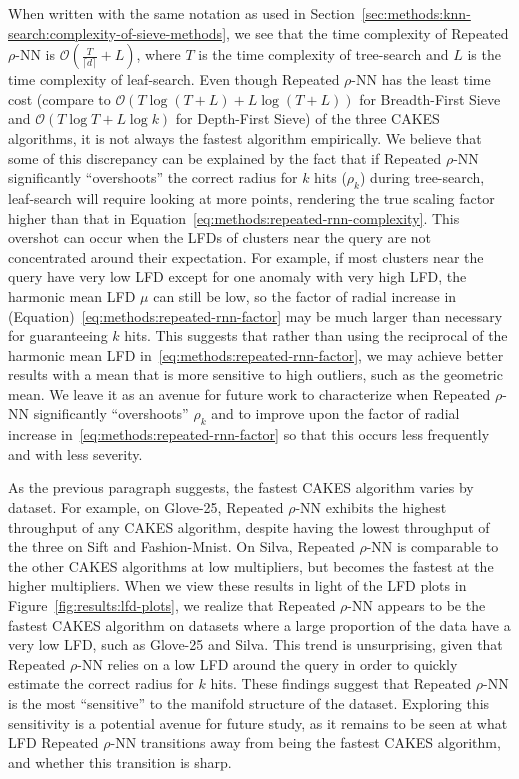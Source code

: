 When written with the same notation as used in Section~\ref{sec:methods:knn-search:complexity-of-sieve-methods}, we see that the time complexity of Repeated $\rho$-NN is $\mathcal{O}(\tfrac{T}{\lceil d \rceil} + L)$, where $T$ is the time complexity of tree-search and $L$ is the time complexity of leaf-search.
Even though Repeated $\rho$-NN has the least time cost (compare to $\mathcal{O}(T\log{(T+L)} + L\log{(T+L)})$ for Breadth-First Sieve and $\mathcal{O}(T\log{T} + L\log{k})$ for Depth-First Sieve) of the three CAKES algorithms, it is not always the fastest algorithm empirically.
We believe that some of this discrepancy can be explained by the fact that if Repeated $\rho$-NN significantly ``overshoots'' the correct radius for $k$ hits ($\rho_k$) during tree-search, leaf-search will require looking at more points, rendering the true scaling factor higher than that in Equation~\ref{eq:methods:repeated-rnn-complexity}.
This overshot can occur when the LFDs of clusters near the query are not concentrated around their expectation.
For example, if most clusters near the query have very low LFD except for one anomaly with very high LFD,
the harmonic mean LFD $\mu$ can still be low, so the factor of radial increase in (Equation)~\ref{eq:methods:repeated-rnn-factor} may be much larger than necessary for guaranteeing $k$ hits.
This suggests that rather than using the reciprocal of the harmonic mean LFD in~\ref{eq:methods:repeated-rnn-factor}, we may achieve better results with a mean that is more sensitive to high outliers, such as the geometric mean.
We leave it as an avenue for future work to characterize when Repeated $\rho$-NN significantly ``overshoots'' $\rho_k$ and to improve upon the factor of radial increase in~\ref{eq:methods:repeated-rnn-factor} so that this occurs less frequently and with less severity.

As the previous paragraph suggests, the fastest CAKES algorithm varies by dataset.
For example, on Glove-25, Repeated $\rho$-NN exhibits the highest throughput of any CAKES algorithm, despite having the lowest throughput of the three on Sift and Fashion-Mnist.
On Silva, Repeated $\rho$-NN is comparable to the other CAKES algorithms at low multipliers, but becomes the fastest at the higher multipliers.
When we view these results in light of the LFD plots in Figure~\ref{fig:results:lfd-plots}, we realize that Repeated $\rho$-NN appears to be the fastest CAKES algorithm on datasets where a large proportion of the data have a very low LFD, such as Glove-25 and Silva.
This trend is unsurprising, given that Repeated $\rho$-NN relies on a low LFD around the query in order to quickly estimate the correct radius for $k$ hits.
These findings suggest that Repeated $\rho$-NN is the most ``sensitive'' to the manifold structure of the dataset.
Exploring this sensitivity is a potential avenue for future study, as it remains to be seen at what LFD Repeated $\rho$-NN transitions away from being the fastest CAKES algorithm, and whether this transition is sharp.

